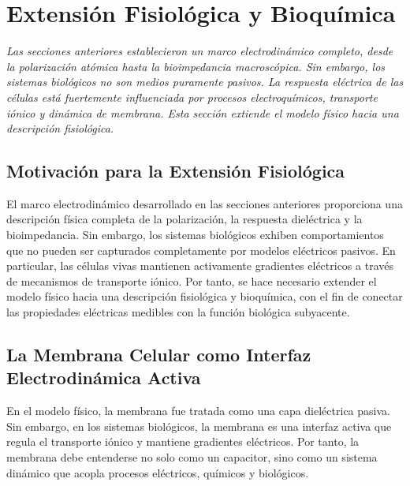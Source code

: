 \documentclass[12pt]{article}
\begin{document}

\section{Extensi\'on Fisiol\'ogica y Bioqu\'imica}

\label{sec:physiological}


\noindent\textit{Las secciones anteriores establecieron un marco electrodin\'amico completo,
desde la polarizaci\'on at\'omica hasta la bioimpedancia macrosc\'opica. Sin embargo, los sistemas
biol\'ogicos no son medios puramente pasivos. La respuesta el\'ectrica de las c\'elulas est\'a
fuertemente influenciada por procesos electroqu\'imicos, transporte i\'onico y din\'amica de
membrana. Esta secci\'on extiende el modelo f\'isico hacia una descripci\'on fisiol\'ogica.}

\subsection{Motivaci\'on para la Extensi\'on Fisiol\'ogica}

El marco electrodin\'amico desarrollado en las secciones anteriores proporciona una descripci\'on
f\'isica completa de la polarizaci\'on, la respuesta diel\'ectrica y la bioimpedancia. Sin embargo,
los sistemas biol\'ogicos exhiben comportamientos que no pueden ser capturados completamente
por modelos el\'ectricos pasivos. En particular, las c\'elulas vivas mantienen activamente
gradientes el\'ectricos a trav\'es de mecanismos de transporte i\'onico. Por tanto, se hace
necesario extender el modelo f\'isico hacia una descripci\'on fisiol\'ogica y bioqu\'imica, con el
fin de conectar las propiedades el\'ectricas medibles con la funci\'on biol\'ogica subyacente.

\subsection{La Membrana Celular como Interfaz Electrodin\'amica Activa}

En el modelo f\'isico, la membrana fue tratada como una capa diel\'ectrica pasiva. Sin embargo,
en los sistemas biol\'ogicos, la membrana es una interfaz activa que regula el transporte
i\'onico y mantiene gradientes el\'ectricos. Por tanto, la membrana debe entenderse no solo
como un capacitor, sino como un sistema din\'amico que acopla procesos el\'ectricos, qu\'imicos
y biol\'ogicos.
\end{document}

